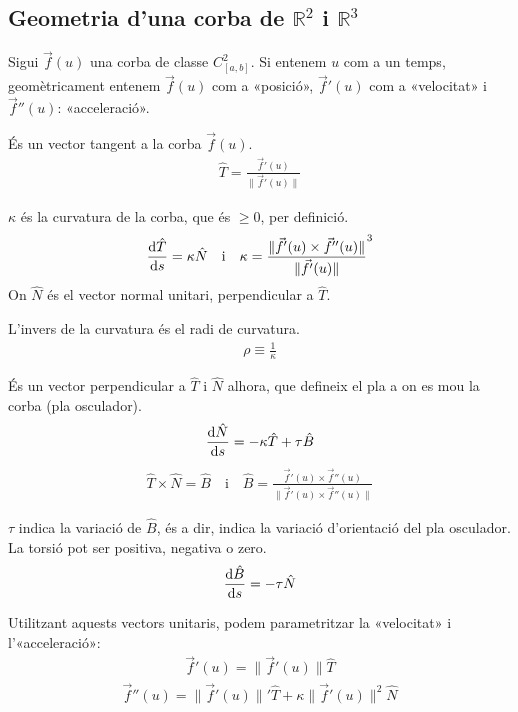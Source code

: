 \subsection{Geometria d'una corba de $\mathbb{R}^{2}$ i $\mathbb{R}^{3}$}
Sigui $\vec{f}(u)$ una corba de classe $C_{[a,b]}^{2}$. Si entenem $u$ com a un temps, geomètricament entenem $\vec{f}(u)$ com a «posició», $\vec{f}'(u)$ com a  «velocitat» i $\vec{f}''(u)$: «acceleració».
\begin{defi}
    És un vector tangent a la corba $\vec{f}(u)$.
    \begin{align}
        \hat{T} = \frac{\vec{f}'(u)}{\| \vec{f}'(u) \|}
    \end{align}
\end{defi}
\begin{defi}[Curvatura]
    $\kappa$ és la curvatura de la corba, que és $\geq 0$, per definició.
        \begin{align}
        \frac{\mathrm{d} \hat{T}}{\mathrm{d} s} = \kappa \hat{N} \quad \text{i} \quad \kappa = \frac{\| \vec{f}'(u) \times \vec{f}''(u) \|}{\| \vec{f}'(u) \|}^{3} 
    \end{align}
    On $\hat{N}$ és el vector normal unitari, perpendicular a $\hat{T}$.
\end{defi}
\begin{defi}
    L'invers de la curvatura és el radi de curvatura.
    \begin{align}
        \rho \equiv \frac{1}{\kappa}
    \end{align}
\end{defi}
\begin{defi}
    És un vector perpendicular a $\hat{T}$ i $\hat{N}$ alhora, que defineix el pla a on es mou la corba (pla osculador).
    \begin{align}
        \frac{\mathrm{d} \hat{N}}{\mathrm{d} s} = - \kappa \hat{T} + \tau \hat{B}
    \end{align}
    \begin{align}
        \hat{T} \times \hat{N} = \hat{B} \quad \text{i} \quad \hat{B} = \frac{\vec{f}'(u) \times \vec{f}''(u)}{\| \vec{f}'(u) \times \vec{f}''(u) \|}
    \end{align}
\end{defi}
\begin{defi}[Torsió]
    $\tau$ indica la variació de $\hat{B}$, és a dir, indica la variació d'orientació del pla osculador. La torsió pot ser positiva, negativa o zero.
    \begin{align}
        \frac{\mathrm{d} \hat{B}}{\mathrm{d} s} = - \tau \hat{N}
    \end{align}
\end{defi}
Utilitzant aquests vectors unitaris, podem parametritzar la «velocitat» i l'«acceleració»:
\begin{align*}
    \vec{f}'(u) = \| \vec{f}'(u) \| \hat{T}
\end{align*}
\begin{align*}
    \vec{f}''(u) = \| \vec{f}'(u) \|' \hat{T} + \kappa \| \vec{f}'(u) \|^{2} \hat{N}
\end{align*}

